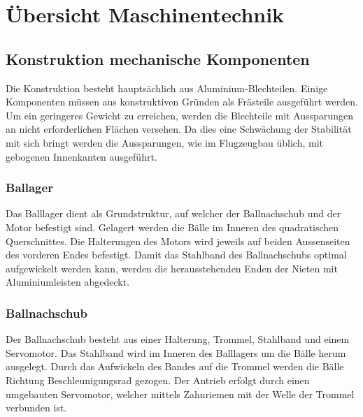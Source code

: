 \section{Übersicht Maschinentechnik}
\subsection{Konstruktion mechanische Komponenten}
Die Konstruktion besteht hauptsächlich aus Aluminium-Blechteilen. Einige 
Komponenten müssen aus konstruktiven Gründen als Frästeile ausgeführt werden.
Um ein geringeres Gewicht zu 
erreichen, werden die Blechteile mit Aussparungen an nicht erforderlichen 
Flächen versehen. Da dies eine Schwächung der Stabilität mit sich bringt werden die Aussparungen, wie im Flugzeugbau üblich, mit gebogenen Innenkanten ausgeführt. 

\subsubsection{Ballager}
Das Balllager dient als Grundstruktur, auf welcher der Ballnachschub und der Motor befestigt sind. Gelagert werden die Bälle im Inneren des quadratischen Querschnittes. Die Halterungen des Motors wird jeweils auf 
beiden Aussenseiten des vorderen Endes befestigt. Damit das Stahlband des Ballnachschubs optimal aufgewickelt werden kann, werden die herausstehenden Enden der Nieten mit Aluminiumleisten abgedeckt.

\subsubsection{Ballnachschub}
Der Ballnachschub besteht aus einer Halterung, Trommel, Stahlband und einem Servomotor. Das Stahlband wird im Inneren des Balllagers um die Bälle herum ausgelegt. Durch das Aufwickeln des Bandes auf die Trommel werden die Bälle Richtung Beschleunigungsrad gezogen. Der Antrieb erfolgt durch einen umgebauten Servomotor, welcher mittels Zahnriemen mit der Welle der Trommel verbunden ist.
